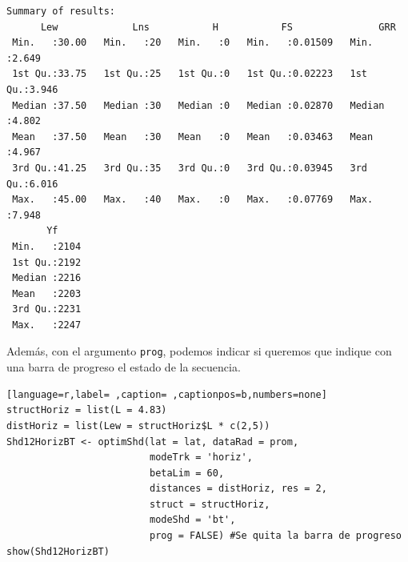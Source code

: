 \begin{verbatim}
Summary of results:
      Lew             Lns           H           FS               GRR       
 Min.   :30.00   Min.   :20   Min.   :0   Min.   :0.01509   Min.   :2.649  
 1st Qu.:33.75   1st Qu.:25   1st Qu.:0   1st Qu.:0.02223   1st Qu.:3.946  
 Median :37.50   Median :30   Median :0   Median :0.02870   Median :4.802  
 Mean   :37.50   Mean   :30   Mean   :0   Mean   :0.03463   Mean   :4.967  
 3rd Qu.:41.25   3rd Qu.:35   3rd Qu.:0   3rd Qu.:0.03945   3rd Qu.:6.016  
 Max.   :45.00   Max.   :40   Max.   :0   Max.   :0.07769   Max.   :7.948  
       Yf      
 Min.   :2104  
 1st Qu.:2192  
 Median :2216  
 Mean   :2203  
 3rd Qu.:2231  
 Max.   :2247
\end{verbatim}

Además, con el argumento \texttt{prog}, podemos indicar si queremos que indique con una barra de progreso el estado de la secuencia.

\begin{lstlisting}[language=r,label= ,caption= ,captionpos=b,numbers=none]
structHoriz = list(L = 4.83)
distHoriz = list(Lew = structHoriz$L * c(2,5))
Shd12HorizBT <- optimShd(lat = lat, dataRad = prom,
                         modeTrk = 'horiz',
                         betaLim = 60,
                         distances = distHoriz, res = 2,
                         struct = structHoriz,
                         modeShd = 'bt',
                         prog = FALSE) #Se quita la barra de progreso
show(Shd12HorizBT)
\end{lstlisting}

